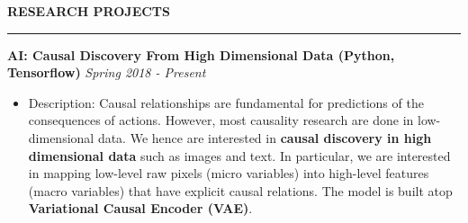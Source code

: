 \documentclass[10pt,letterpaper]{article}
\newenvironment{mysection}[1]{ %
  \medskip
  \MakeUppercase{\bf #1}
  \medskip
  \hrule
  \medskip
  \begin{list}{}{
      \setlength{\leftmargin}{1.5em}
    }
  \item[]
}{
  \end{list}
}
\begin{document}
\begin{mysection}{Research Projects}



  
  \textbf{AI: Causal Discovery From High Dimensional Data (Python,
    Tensorflow)} \hfill \emph{Spring 2018 - Present}

  \begin{itemize}
  \item Description: Causal relationships are fundamental for
    predictions of the consequences of actions. However, most
    causality research are done in low-dimensional data. We hence are
    interested in \textbf{causal discovery in high dimensional data}
    such as images and text. In particular, we are interested in
    mapping low-level raw pixels (micro variables) into high-level
    features (macro variables) that have explicit causal relations.
    The model is built atop \textbf{Variational Causal Encoder (VAE)}.
  \end{itemize}
  

\end{mysection}
\end{document}
